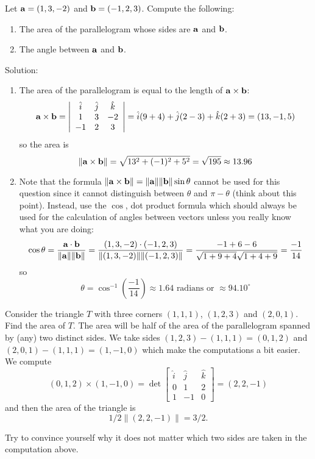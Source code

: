 \begin{example}
\label{2008_a2_2} Let $\aa = (1,3,-2)$ and $\bb = (-1,2,3)$. Compute
the following:
{\begin{enumerate}
\renewcommand{\labelenumi}{(\alph{enumi})}
\item The area of the parallelogram whose sides are $\aa$ and $\bb$. 
\item The angle between $\aa$ and $\bb$. 
\end{enumerate}}
{\rm Solution:
\begin{enumerate}
\renewcommand{\labelenumi}{(\alph{enumi})}
\item The area of the parallelogram is equal to the length of 
$\aa \times \bb$:
\[
\aa \times \bb =  \left| \begin{array}{ccc}
\hat{i} & \hat{j} & \hat{k} \\
1 & 3 & -2 \\
-1 & 2 & 3
\end{array} \right| = \hat{i} (9+4) + \hat{j} (2-3) + \hat{k}(2+3) 
   = (13,-1,5) 
\]
so the area is 
\[
\| \aa \times \bb \| = \sqrt{13^2 + (-1)^2 + 5^2} = \sqrt{195} 
   \approx 13.96
\]
\item Note that the formula 
$\| \aa \times \bb \| = \| \aa \| \| \bb \| \sin \theta$ cannot be used 
for this question since it cannot distinguish between $\theta$ and 
$\pi - \theta$ (think about this point). Instead, use the $\cos$, dot 
product formula which should always be used for the calculation of 
angles between vectors unless you really know what you are doing:
\[
\cos \theta = \frac{\aa \cdot \bb}{\| \aa \| \| \bb \|} = 
\frac{(1,3,-2)\cdot (-1,2,3)}{\|(1,3,-2)\| \|(-1,2,3)\|} 
= \frac{-1+6-6}{\sqrt{1+9+4} \sqrt{1+4+9}} = \frac{-1}{14} 
\]
so 
\[
\theta = \cos^{-1} \left( \frac{-1}{14} \right) \approx 1.64 
   \mbox{\ radians or $\approx 94.10^\circ$}
\]
\end{enumerate}}
\end{example}

\begin{example}
Consider the triangle $T$ with three corners $(1,1,1)$, $(1,2,3)$ and $(2,0,1)$. Find the 
area of $T$. 
{\rm The area will be half of the area of the parallelogram spanned by (any) two 
distinct sides. We take sides $(1,2,3)-(1,1,1) = (0,1,2)$ and $(2,0,1) -(1,1,1) = (1,-1,0)$
which make the computations a bit easier. We compute 
\[
(0,1,2) \times (1,-1,0) = \det \left[ \begin{array}{ccc}
\hat{i} & \hat{j} & \hat{k} \\
0 & 1 & 2 \\
1 & -1 & 0
\end{array} \right] = (2, 2,-1) 
\]
and then the area of the triangle is 
\[
1/2 \| (2,2,-1) \| = 3/2. 
\] 
} 
\end{example} 
Try to convince yourself why it does not matter which two sides are taken in the computation above. 

